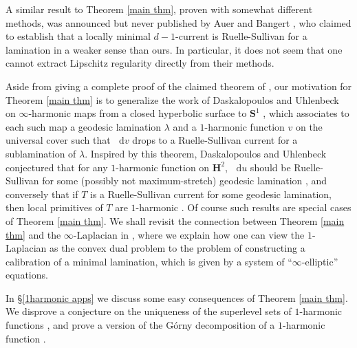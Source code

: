 \documentclass[reqno,11pt]{amsart}
\newcommand{\Hyp}{\mathbf H}
\newcommand{\Sph}{\mathbf S}
\newcommand*\dif{\mathop{}\!\mathrm{d}}
\theoremstyle{definition}
\numberwithin{equation}{section}
\begin{document}
A similar result to Theorem \ref{main thm}, proven with somewhat different methods, was announced but never published by Auer and Bangert \cite[Theorem 1]{Auer01}, who claimed to establish that a locally minimal $d - 1$-current is Ruelle-Sullivan for a lamination in a weaker sense than ours.
In particular, it does not seem that one cannot extract Lipschitz regularity directly from their methods.

Aside from giving a complete proof of the claimed theorem of \cite{Auer01}, our motivation for Theorem \ref{main thm} is to generalize the work of Daskalopoulos and Uhlenbeck on $\infty$-harmonic maps from a closed hyperbolic surface to $\Sph^1$ \cite{daskalopoulos2020transverse}, which associates to each such map a geodesic lamination $\lambda$ and a $1$-harmonic function $v$ on the universal cover such that $\dif v$ drops to a Ruelle-Sullivan current for a sublamination of $\lambda$.
Inspired by this theorem, Daskalopoulos and Uhlenbeck conjectured that for any $1$-harmonic function on $\Hyp^2$, $\dif u$ should be Ruelle-Sullivan for some (possibly not maximum-stretch) geodesic lamination \cite[Problem 9.4]{daskalopoulos2020transverse}, and conversely that if $T$ is a Ruelle-Sullivan current for some geodesic lamination, then local primitives of $T$ are $1$-harmonic \cite[Conjecture 9.5]{daskalopoulos2020transverse}.
Of course such results are special cases of Theorem \ref{main thm}.
We shall revisit the connection between Theorem \ref{main thm} and the $\infty$-Laplacian in \cite{BackusInfinityMaxwell1}, where we explain how one can view the $1$-Laplacian as the convex dual problem to the problem of constructing a calibration of a minimal lamination, which is given by a system of ``$\infty$-elliptic'' equations.

In \S\ref{1harmonic apps} we discuss some easy consequences of Theorem \ref{main thm}.
We disprove a conjecture on the uniqueness of the superlevel sets of $1$-harmonic functions \cite[Remark 2.8]{Mazon14}, and prove a version of the G\'orny decomposition of a $1$-harmonic function \cite[Theorem 1.2]{górny2017planar}.
\end{document}
